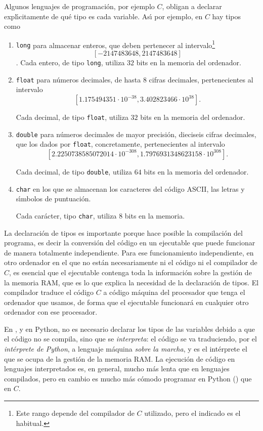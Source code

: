 Algunos lenguajes de programaci\'on, por ejemplo $C$, obligan a declarar
expl\'{\i}citamente de qu\'e tipo es cada variable. As\'{\i} por ejemplo, en $C$
hay tipos como
\begin{enumerate}
 \item {\tt long} para almacenar enteros, que deben pertenecer  al
intervalo\footnote{Este rango depende del compilador de $C$ utilizado, pero el
indicado es el habitual.} \[[-2147483648,2147483648]\].
\label{tipos}
Cada entero, de tipo {\tt long},  utiliza $32$ bits en la memoria del
ordenador. 

\item{\tt float} para n\'umeros decimales, de hasta $8$ cifras decimales,
pertenecientes al intervalo \[[1.175494351\cdot 10^{-38},3.402823466\cdot
10^{38}].\]

Cada decimal, de tipo {\tt float},  utiliza $32$ bits en la memoria del
ordenador. 

\item{\tt double} para n\'umeros decimales de mayor precisi\'on, dieciseis
cifras decimales,  que los dados por {\tt float}, concretamente, pertenecientes
al intervalo
\[[2.2250738585072014\cdot 10^{-308},1.7976931348623158\cdot 10^{308}].\]

Cada decimal, de tipo {\tt double},  utiliza $64$ bits en la memoria del
ordenador. 
\item {\tt char} en los que se almacenan los caracteres del c\'odigo ASCII, las
letras y s\'{\i}mbolos de puntuaci\'on.

Cada car\'acter, tipo {\tt char}, utiliza $8$ bits en la memoria. 
\end{enumerate}


La declaraci\'on de tipos es importante porque hace posible la compilaci\'on
del programa, es decir la conversi\'on del c\'odigo en un ejecutable que puede
funcionar de manera totalmente independiente.  Para ese funcionamiento
independiente, en otro ordenador en el que no est\'an necesariamente  ni el
c\'odigo ni el compilador de $C$, es esencial que el ejecutable contenga toda
la informaci\'on sobre la gesti\'on de la memoria RAM, que es lo que explica la
necesidad de la declaraci\'on de tipos.  El compilador traduce el c\'odigo $C$ a
c\'odigo m\'aquina del procesador que tenga el ordenador que usamos, de forma
que el ejecutable funcionar\'a en cualquier otro ordenador con ese procesador. 


En {\sage}, y en Python, no es necesario declarar los tipos de las variables
debido a que el c\'odigo no se compila, sino que se {\itshape interpreta}: el
c\'odigo se va traduciendo, por el {\itshape int\'erprete de Python},  a
lenguaje m\'aquina {\itshape sobre la marcha}, y es el int\'erprete el que se
ocupa de la gesti\'on de la memoria RAM. La ejecuci\'on de c\'odigo en
lenguajes interpretados es, en general, mucho m\'as lenta que en lenguajes
compilados, pero en cambio es mucho m\'as c\'omodo programar en Python ({\sage})
que en $C$.


